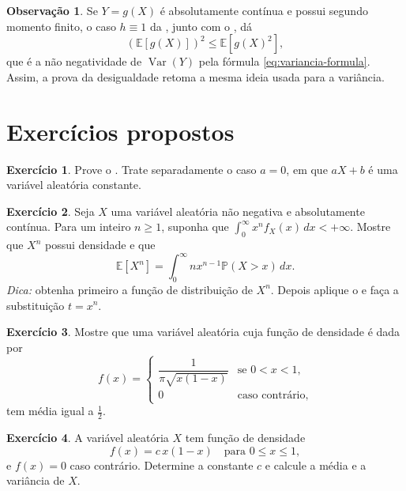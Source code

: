 \documentclass[12pt,portuguese]{article}
\theoremstyle{definition}
\newtheorem{remark}[remark]{Observação}
\theoremstyle{plainexercise}
\newtheorem{exercise}{Exercício}
\theoremstyle{starredexercise}
\theoremstyle{definition}
\begin{document}
\begin{remark}\label{rem:cauchy-schwarz-moral}
  Se $Y=g(X)$ é absolutamente contínua e possui segundo
  momento finito, o caso $h\equiv1$ da ,
  junto com o , dá
  \[
    (\mathbb{E}[g(X)])^2 \leqslant \mathbb{E}[g(X)^2],
  \]
  que é a não negatividade de $\operatorname{Var}(Y)$ pela fórmula
  \eqref{eq:variancia-formula}. Assim, a prova da desigualdade retoma
  a mesma ideia usada para a variância.
\end{remark}


\bigskip

\section{Exercícios propostos}\label{sec:exercicios-propostos}

\bigskip

\begin{exercise}\label{exercise:prova-linearidade}
  Prove o . Trate separadamente o caso
  $a=0$, em que $aX+b$ é uma variável aleatória constante.
\end{exercise}

\begin{exercise}\label{exercise:momentos-cauda}
  Seja $X$ uma variável aleatória não negativa e absolutamente contínua.
  Para um inteiro $n\geqslant1$, suponha que
  $\int_0^\infty x^n f_X(x)\,dx<+\infty$. Mostre que $X^n$ possui
  densidade e que
  \[
    \mathbb{E}[X^n]
    =\int_0^\infty n x^{n-1}\mathbb{P}(X>x)\,dx.
  \]
  \emph{Dica:} obtenha primeiro a função de distribuição de $X^n$.
  Depois aplique o  e faça a substituição
  $t=x^n$.
\end{exercise}

\begin{exercise}\label{exercise:esperanca-arcoseno}
  Mostre que uma variável aleatória cuja função de densidade é dada por
  \[
    f(x) = \begin{cases}
      \dfrac{1}{\pi\sqrt{x(1 - x)}} & \text{se } 0 < x < 1,
      \\[0.8cm]
      0 & \text{caso contrário,}
    \end{cases}
  \]
  tem média igual a $\frac{1}{2}$.
\end{exercise}

\medskip

\begin{exercise}\label{exercise:densidade-quadratica}
  A variável aleatória $X$ tem função de densidade
  \[
    f(x) = c\,x(1 - x) \quad \text{para } 0 \leqslant x \leqslant 1,
  \]
  e $f(x) = 0$ caso contrário.
  Determine a constante $c$ e calcule a média e a variância de $X$.
\end{exercise}
\end{document}
